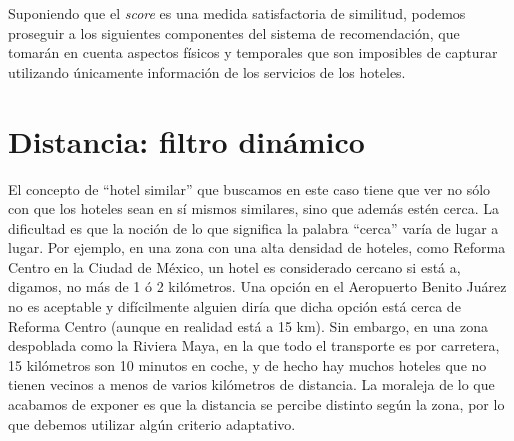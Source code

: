 \documentclass[12pt]{report}
\begin{document}
Suponiendo que el \emph{score} es una medida satisfactoria de similitud, podemos proseguir a los siguientes componentes del sistema de recomendación, que tomarán en cuenta aspectos físicos y temporales que son imposibles de capturar utilizando únicamente información de los servicios de los hoteles.

\section{Distancia: filtro dinámico}

El concepto de ``hotel similar'' que buscamos en este caso tiene que ver no sólo con que los hoteles sean en sí mismos similares, sino que además estén cerca. La dificultad es que la noción de lo que significa la palabra ``cerca'' varía de lugar a lugar. Por ejemplo, en una zona con una alta densidad de hoteles, como Reforma Centro en la Ciudad de México, un hotel es considerado cercano si está a, digamos, no más de 1 ó 2 kilómetros. Una opción en el Aeropuerto Benito Juárez no es aceptable y difícilmente alguien diría que dicha opción está cerca de Reforma Centro (aunque en realidad está a 15 km). Sin embargo, en una zona despoblada como la Riviera Maya, en la que todo el transporte es por carretera, 15 kilómetros son 10 minutos en coche, y de hecho hay muchos hoteles que no tienen vecinos a menos de varios kilómetros de distancia. La moraleja de lo que acabamos de exponer es que la distancia se percibe distinto según la zona, por lo que debemos utilizar algún criterio adaptativo.
\end{document}
